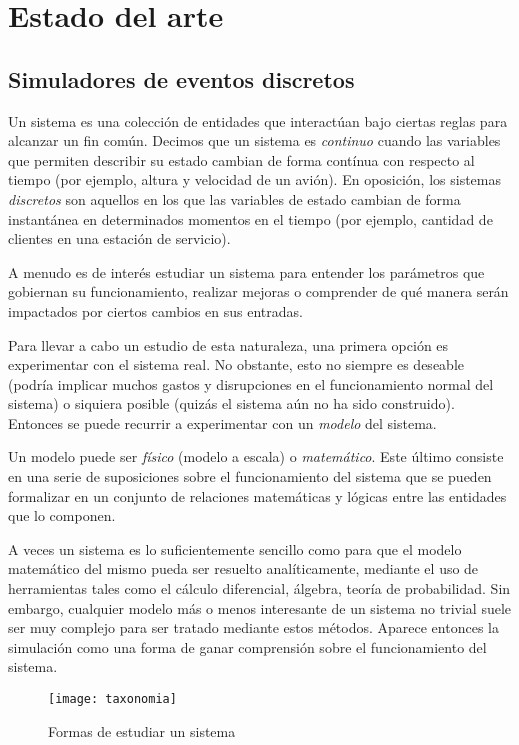\chapter{Estado del arte}\label{sec:eda}

\section{Simuladores de eventos discretos}

Un sistema es una colección de entidades que interactúan bajo ciertas reglas
para alcanzar un fin común. Decimos que un sistema es \textit{continuo} cuando
las variables que permiten describir su estado cambian de forma contínua con
respecto al tiempo (por ejemplo, altura y velocidad de un avión). En oposición,
los sistemas \textit{discretos} son aquellos en los que las variables de estado
cambian de forma instantánea en determinados momentos en el tiempo (por
ejemplo, cantidad de clientes en una estación de servicio).

A menudo es de interés estudiar un sistema para entender los parámetros que
gobiernan su funcionamiento, realizar mejoras o comprender de qué manera serán
impactados por ciertos cambios en sus entradas.

Para llevar a cabo un estudio de esta naturaleza, una primera opción es
experimentar con el sistema real. No obstante, esto no siempre es deseable
(podría implicar muchos gastos y disrupciones en el funcionamiento normal del
sistema) o siquiera posible (quizás el sistema aún no ha sido construido).
Entonces se puede recurrir a experimentar con un \textit{modelo} del sistema.

Un modelo puede ser \textit{físico} (modelo a escala) o \textit{matemático}.
Este último consiste en una serie de suposiciones sobre el funcionamiento del
sistema que se pueden formalizar en un conjunto de relaciones matemáticas y
lógicas entre las entidades que lo componen.

A veces un sistema es lo suficientemente sencillo como para que el modelo
matemático del mismo pueda ser resuelto analíticamente, mediante el uso de
herramientas tales como el cálculo diferencial, álgebra, teoría de
probabilidad. Sin embargo, cualquier modelo más o menos interesante de un
sistema no trivial suele ser muy complejo para ser tratado mediante estos
métodos. Aparece entonces la simulación como una forma de ganar comprensión
sobre el funcionamiento del sistema.

\begin{figure}[h]
\caption{Formas de estudiar un sistema}
\centering
\texttt{[image: taxonomia]}
\end{figure}

